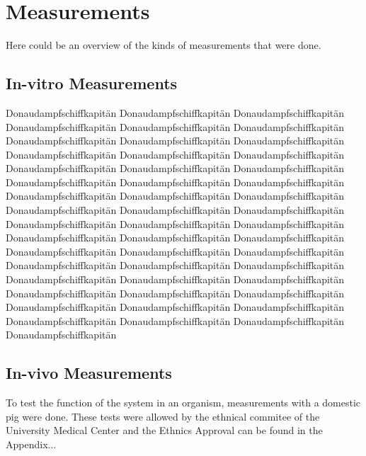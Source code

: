 %
%
\chapter{Measurements}
\label{Ch:Results}	

Here could be an overview of the kinds of measurements that were done.


\section{In-vitro Measurements}
Donaudampfschiffkapitän Donaudampfschiffkapitän Donaudampfschiffkapitän Donaudampfschiffkapitän Donaudampfschiffkapitän Donaudampfschiffkapitän
Donaudampfschiffkapitän Donaudampfschiffkapitän Donaudampfschiffkapitän Donaudampfschiffkapitän Donaudampfschiffkapitän Donaudampfschiffkapitän 
Donaudampfschiffkapitän Donaudampfschiffkapitän Donaudampfschiffkapitän Donaudampfschiffkapitän Donaudampfschiffkapitän Donaudampfschiffkapitän 
Donaudampfschiffkapitän Donaudampfschiffkapitän Donaudampfschiffkapitän Donaudampfschiffkapitän Donaudampfschiffkapitän Donaudampfschiffkapitän 
Donaudampfschiffkapitän Donaudampfschiffkapitän Donaudampfschiffkapitän Donaudampfschiffkapitän Donaudampfschiffkapitän Donaudampfschiffkapitän 
Donaudampfschiffkapitän Donaudampfschiffkapitän Donaudampfschiffkapitän Donaudampfschiffkapitän Donaudampfschiffkapitän Donaudampfschiffkapitän 
Donaudampfschiffkapitän Donaudampfschiffkapitän Donaudampfschiffkapitän Donaudampfschiffkapitän Donaudampfschiffkapitän Donaudampfschiffkapitän 
Donaudampfschiffkapitän Donaudampfschiffkapitän Donaudampfschiffkapitän Donaudampfschiffkapitän Donaudampfschiffkapitän Donaudampfschiffkapitän 
Donaudampfschiffkapitän


\section{In-vivo Measurements}
To test the function of the system in an organism, measurements with a domestic pig were done. These tests were allowed by the ethnical commitee of the University Medical Center and the Ethnics Approval can be found in the Appendix... 


